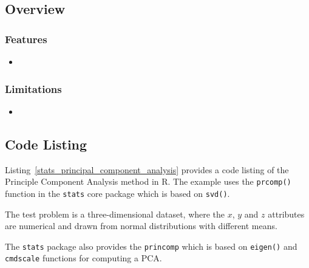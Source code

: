 \subsection{Overview}

\subsubsection{Features}

\begin{itemize}
	\item 
\end{itemize}

\subsubsection{Limitations}

\begin{itemize}
	\item 
\end{itemize}


\subsection{Code Listing}
Listing~\ref{stats_principal_component_analysis} provides a code listing of the Principle Component Analysis method in R.
The example uses the \texttt{prcomp()} function in the \texttt{stats} core package which is based on \texttt{svd()}.

The test problem is a three-dimensional dataset, where the $x$, $y$ and $z$ attributes are numerical and drawn from normal distributions with different means. 




The \texttt{stats} package also provides the \texttt{princomp} which is based on \texttt{eigen()} and \texttt{cmdscale} functions for computing a PCA.

